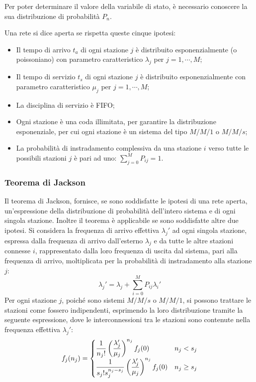 \documentclass{article}
\numberwithin{equation}{subsection}
\begin{document}
Per poter determinare il valore della variabile di stato, è necessario conoscere la sua distribuzione di probabilità $P_n$. 

Una rete si dice aperta se rispetta queste cinque ipotesi:
\begin{itemize}
    \item Il tempo di arrivo $t_a$ di ogni stazione $j$ è distribuito esponenzialmente (o poissoniano) con parametro caratteristico $\lambda_j$ per $j=1,\cdots,M$;
    \item Il tempo di servizio $t_s$ di ogni stazione $j$ è distribuito esponenzialmente con parametro caratteristico $\mu_j$ per $j=1,\cdots, M$;
    \item La disciplina di servizio è FIFO;
    \item Ogni stazione è una coda illimitata, per garantire la distribuzione esponenziale, per cui ogni stazione è un sistema del tipo $M/M/1$ o $M/M/s$;
    \item La probabilità di instradamento complessiva da una stazione $i$ verso tutte le possibili stazioni $j$ è pari ad uno: $\displaystyle\sum_{j=0}^{M}P_{ij}=1$.
\end{itemize} 

\subsubsection{Teorema di Jackson}

Il teorema di Jackson, fornisce, se sono soddisfatte le ipotesi di una rete aperta, un'espressione della distribuzione di probabilità dell'intero sistema e di ogni singola 
stazione. 
Inoltre il teorema è applicabile se sono soddisfatte altre due ipotesi. 
Si considera la frequenza di arrivo effettiva $\lambda_j'$ ad ogni singola stazione, espressa dalla frequenza di arrivo dall'esterno $\lambda_j$ e da tutte le altre stazioni 
connesse $i$, rappresentato dalla loro frequenza di uscita dal sistema, pari alla frequenza di arrivo, moltiplicata per la probabilità di instradamento alla stazione $j$:
\begin{equation}
    \lambda_j'=\lambda_j+\displaystyle\sum_{i=0}^{M}P_{ij}\lambda_i'
\end{equation}
Per ogni stazione $j$, poiché sono sistemi $M/M/s$ o $M/M/1$, si possono trattare le stazioni come fossero indipendenti, esprimendo la loro distribuzione tramite 
la seguente espressione, dove le interconnessioni tra le stazioni sono contenute nella frequenza effettiva $\lambda_j'$: 
\begin{equation}
    f_j(n_j)=\begin{cases}
        \displaystyle\frac{\strut 1}{\strut n_j!}\left(\frac{\lambda_j'}{\mu_j}\right)^{n_j}f_j(0)&n_j<s_j\\
        \displaystyle\frac{\strut 1}{\strut s_j!s_j^{n_j-s_j}}\left(\frac{\lambda_j'}{\mu_j}\right)^{n_j}f_j(0)&n_j\geq s_j
    \end{cases}
\end{equation}
\end{document}
